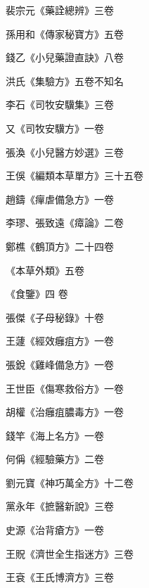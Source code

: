 \begin{pinyinscope}
 裴宗元《藥詮總辨》三卷



 孫用和《傳家秘寶方》五卷



 錢乙《小兒藥證直訣》八卷



 洪氏《集驗方》五卷不知名



 李石《司牧安驥集》三卷



 又《司牧安驥方》一卷



 張渙《小兒醫方妙選》三卷



 王俁《編類本草單方》三十五卷



 趙鑄《癉虐備急方》一卷



 李璆、張致遠《瘴論》二卷



 鄭樵《鶴頂方》二十四卷



 《本草外類》五卷



 《食鑒》四
 卷



 張傑《子母秘錄》十卷



 王蘧《經效癰疽方》一卷



 張銳《雞峰備急方》一卷



 王世臣《傷寒救俗方》一卷



 胡權《治癰疽膿毒方》一卷



 錢竿《海上名方》一卷



 何偁《經驗藥方》二卷



 劉元寶《神巧萬全方》十二卷



 黨永年《摭醫新說》三卷



 史源《治背瘡方》一卷



 王貺《濟世全生指迷方》三卷



 王袞《王氏博濟方》三卷




\end{pinyinscope}
